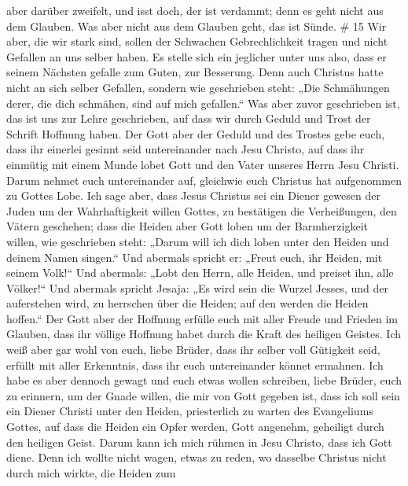 aber darüber zweifelt, und isst doch, der ist verdammt; denn es geht
nicht aus dem Glauben. Was aber nicht aus dem Glauben geht, das ist
Sünde. \# 15  Wir aber, die wir stark sind, sollen der
Schwachen Gebrechlichkeit tragen und nicht Gefallen an uns selber haben.
 Es stelle sich ein jeglicher unter uns also, dass er seinem
Nächsten gefalle zum Guten, zur Besserung.  Denn auch
Christus hatte nicht an sich selber Gefallen, sondern wie geschrieben
steht: „Die Schmähungen derer, die dich schmähen, sind auf mich
gefallen.``  Was aber zuvor geschrieben ist, das ist uns zur
Lehre geschrieben, auf dass wir durch Geduld und Trost der Schrift
Hoffnung haben.  Der Gott aber der Geduld und des Trostes
gebe euch, dass ihr einerlei gesinnt seid untereinander nach Jesu
Christo,  auf dass ihr einmütig mit einem Munde lobet Gott
und den Vater unseres Herrn Jesu Christi.  Darum nehmet euch
untereinander auf, gleichwie euch Christus hat aufgenommen zu Gottes
Lobe.  Ich sage aber, dass Jesus Christus sei ein Diener
gewesen der Juden um der Wahrhaftigkeit willen Gottes, zu bestätigen die
Verheißungen, den Vätern geschehen;  dass die Heiden aber
Gott loben um der Barmherzigkeit willen, wie geschrieben steht: „Darum
will ich dich loben unter den Heiden und deinem Namen singen.``
 Und abermals spricht er: „Freut euch, ihr Heiden, mit
seinem Volk!{}``  Und abermals: „Lobt den Herrn, alle
Heiden, und preiset ihn, alle Völker!{}``  Und abermals
spricht Jesaja: „Es wird sein die Wurzel Jesses, und der auferstehen
wird, zu herrschen über die Heiden; auf den werden die Heiden hoffen.``
 Der Gott aber der Hoffnung erfülle euch mit aller Freude
und Frieden im Glauben, dass ihr völlige Hoffnung habet durch die Kraft
des heiligen Geistes.  Ich weiß aber gar wohl von euch,
liebe Brüder, dass ihr selber voll Gütigkeit seid, erfüllt mit aller
Erkenntnis, dass ihr euch untereinander könnet ermahnen. 
Ich habe es aber dennoch gewagt und euch etwas wollen schreiben, liebe
Brüder, euch zu erinnern, um der Gnade willen, die mir von Gott gegeben
ist,  dass ich soll sein ein Diener Christi unter den
Heiden, priesterlich zu warten des Evangeliums Gottes, auf dass die
Heiden ein Opfer werden, Gott angenehm, geheiligt durch den heiligen
Geist.  Darum kann ich mich rühmen in Jesu Christo, dass
ich Gott diene.  Denn ich wollte nicht wagen, etwas zu
reden, wo dasselbe Christus nicht durch mich wirkte, die Heiden zum
